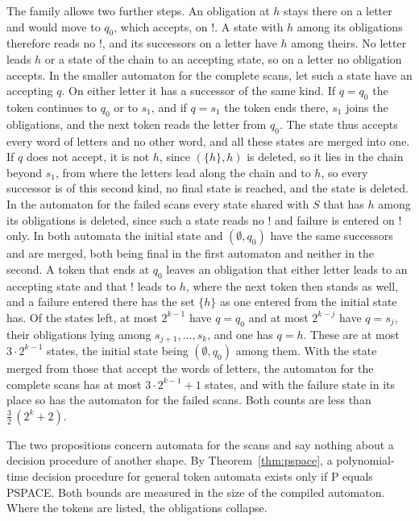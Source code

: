 \documentclass[11pt,a4paper]{article}
\theoremstyle{definition}
\theoremstyle{plain}
\newcommand{\code}[1]{\texttt{#1}}
\begin{document}
The family allows two further steps. An obligation at $h$ stays there on a letter and would move to $q_0$, which
accepts, on $\code{!}$. A state with $h$ among its obligations therefore reads no $\code{!}$, and its successors on a
letter have $h$ among theirs. No letter leads $h$ or a state of the chain to an accepting state, so on a letter no
obligation accepts. In the smaller automaton for the complete scans, let such a state have an accepting $q$. On either
letter it has a successor of the same kind. If $q = q_0$ the token continues to $q_0$ or to $s_1$, and if $q = s_1$ the
token ends there, $s_1$ joins the obligations, and the next token reads the letter from $q_0$. The state thus accepts
every word of letters and no other word, and all these states are merged into one. If $q$ does not accept, it is not
$h$, since $(\{h\}, h)$ is deleted, so it lies in the chain beyond $s_1$, from where the letters lead along the chain
and to $h$, so every successor is of this second kind, no final state is reached, and the state is deleted. In the
automaton for the failed scans every state shared with $S$ that has $h$ among its obligations is deleted, since such a
state reads no $\code{!}$ and failure is entered on $\code{!}$ only. In both automata the initial state and
$(\emptyset, q_0)$ have the same successors and are merged, both being final in the first automaton and neither in the
second. A token that ends at $q_0$ leaves an obligation that either letter leads to an accepting state and that
$\code{!}$ leads to $h$, where the next token then stands as well, and a failure entered there has the set $\{h\}$ as
one entered from the initial state has. Of the states left, at most $2^{k-1}$ have $q = q_0$ and at most $2^{k-j}$ have
$q = s_j$, their obligations lying among $s_{j+1}, \ldots, s_k$, and one has $q = h$. These are at most
$3 \cdot 2^{k-1}$ states, the initial state being $(\emptyset, q_0)$ among them. With the state merged from those that
accept the words of letters, the automaton for the complete scans has at most $3 \cdot 2^{k-1} + 1$ states, and with the
failure state in its place so has the automaton for the failed scans. Both counts are less than
$\tfrac{3}{2}\,(2^k + 2)$.

The two propositions concern automata for the scans and say nothing about a decision procedure of another shape. By
Theorem~\ref{thm:pspace}, a polynomial-time decision procedure for general token automata exists only if P equals
PSPACE. Both bounds are measured in the size of the compiled automaton. Where the tokens are listed, the obligations
collapse.
\end{document}
